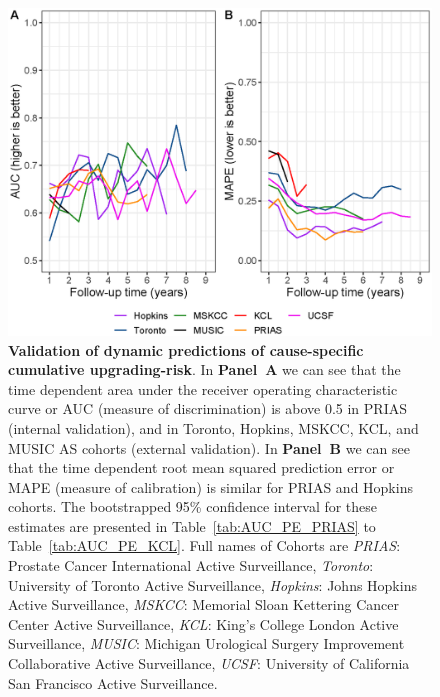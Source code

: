 \begin{figure}[!htb]
\centerline{\includegraphics[width=\columnwidth]{images/auc_pe_recalib.eps}}
\caption{\textbf{Validation of dynamic predictions of cause-specific cumulative upgrading-risk}. In \textbf{Panel~A} we can see that the time dependent area under the receiver operating characteristic curve or AUC (measure of discrimination) is above 0.5 in PRIAS (internal validation), and in Toronto, Hopkins, MSKCC, KCL, and MUSIC AS cohorts (external validation). In \textbf{Panel~B} we can see that the time dependent root mean squared prediction error or MAPE (measure of calibration) is similar for PRIAS and Hopkins cohorts. The bootstrapped 95\% confidence interval for these estimates are presented in Table~\ref{tab:AUC_PE_PRIAS} to Table~\ref{tab:AUC_PE_KCL}. Full names of Cohorts are \textit{PRIAS}: Prostate Cancer International Active Surveillance, \textit{Toronto}: University of Toronto Active Surveillance, \textit{Hopkins}: Johns Hopkins Active Surveillance, \textit{MSKCC}: Memorial Sloan Kettering Cancer Center Active Surveillance, \textit{KCL}: King's College London Active Surveillance, \textit{MUSIC}: Michigan Urological Surgery Improvement Collaborative Active Surveillance, \textit{UCSF}: University of California San Francisco Active Surveillance.}
\label{fig:auc_pe_recalib}
\end{figure}

